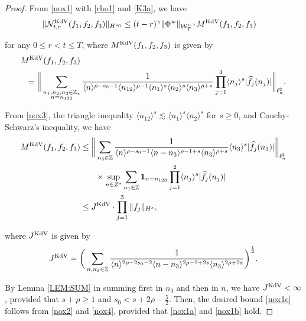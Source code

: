 \documentclass[letterpaper, 11pt,  reqno]{amsart}
\newcommand{\1}{\hspace{0.5mm}\text{I}\hspace{0.5mm}}
\newcommand{\noi}{\noindent}
\newcommand{\Z}{\mathbb{Z}}
\newcommand{\g}{\gamma}
\newcommand{\ft}{\widehat}
\renewcommand{\l}{\ell}
\newcommand{\les}{\lesssim}
\newcommand{\jb}[1]
{\langle #1 \rangle}
\newcommand{\ind}{\mathbf 1}
\newcommand{\NN}{\mathcal{N}}
\newcommand{\W}{\mathcal{W}}
\newcommand{\KDV}{\text{\rm KdV} }
\numberwithin{equation}{section}
\numberwithin{theorem}{section}
\begin{document}
\begin{proof}%

From \eqref{nox1} with \eqref{rho1} and \eqref{K3a}, we have
\begin{align}
 \| \NN^\KDV_{t, r}(f_1, f_2, f_3)\|_{H^{s_0}}
&  \le
(t- r)^\g \|\Phi^w\|_{  \W^{\rho,\g}_T}M^\KDV(f_1, f_2, f_3)
\label{nox2}
\end{align}

\noi
for any $0 \le r < t \le T$, 
where $M^\KDV(f_1, f_2, f_3)$ is given by 
\begin{align}
\begin{split}
& M^\KDV(f_1, f_2, f_3)\\
& \ \  =\bigg\|
\sum_{\substack{n_1, n_2, n_3 \in \Z_*\\n = n_{123}}}
\frac{1}{\jb{n}^{\rho-s_0 - 1}
\jb{n_{12}}^{\rho-1}
\jb{n_1}^{s}\jb{n_2}^{s}\jb{n_3}^{\rho+s}} 
\prod_{j = 1}^3\jb{n_j}^s|\ft f_j(n_j)|
\bigg\|_{\l^2_n}.
\end{split}
\label{nox3}
\end{align}




From \eqref{nox3}, the triangle inequality $\jb{n_{12}}^s \les \jb{n_1}^s\jb{n_2}^s$
for $s \ge 0$, and Cauchy-Schwarz's inequality, we have 
\begin{align}
\begin{split}
 M^\KDV(f_1, f_2, f_3)
&   \le \bigg\|
\sum_{ n_3 \in \Z}
\frac{1}{\jb{n}^{\rho-s_0 - 1}
\jb{n - n_3}^{\rho-1+s}
\jb{n_3}^{\rho+s}} 
\jb{n_3}^s|\ft f_j(n_3)|\bigg\|_{\l^2_n}\\
 & \hphantom{XX} \times 
\sup_{n \in Z^*}\sum_{ n_1 \in \Z}
\ind_{n = n_{123}}
\prod_{j = 1}^2
\jb{n_j}^s|\ft f_j(n_j)|
\\
& 
\le 
 J^\KDV\cdot \prod_{j = 1}^3\|f_j\|_{H^s}, 
\end{split}
\label{nox4}
\end{align}


\noi
where  $ J^\KDV$ is given by 
\begin{align*}
 J^\KDV
= \bigg(\sum_{n,  n_3 \in \Z}
\frac{1}{\jb{n}^{2\rho-2s_0 - 2}
\jb{n - n_3}^{2\rho-2+2s}
\jb{n_3}^{2\rho+2s}} 
\bigg)^\frac 12.
\end{align*}

\noi
By
Lemma \ref{LEM:SUM}
in summing first in $n_3$ and then in $n$, we have $J^\KDV < \infty$, 
\noi
provided that 
$s + \rho  \ge 1$ and $s_0 < s + 2\rho - \frac 52$.
Then, the desired bound \eqref{nox1c} follows
from \eqref{nox2} and \eqref{nox4},  
provided that \eqref{nox1a}
and \eqref{nox1b}
hold.
\end{proof}
\end{document}
